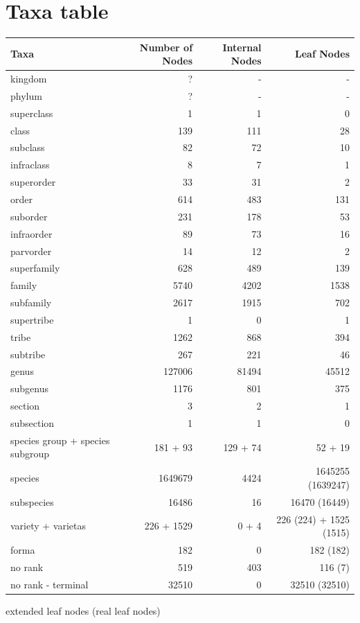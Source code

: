   \section{Taxa table}\label{sec:taxaTable2}
    \begin{center}
      \begin{tabular}{ |l|r||r|r| }
        \hline
        Taxa & Number of Nodes & Internal Nodes & Leaf Nodes \\
        \hline \hline
        \setrow{\bfseries}kingdom & ? & - & - \\ \hline
        \setrow{\bfseries}phylum & ? & - & - \\
        superclass & 1 & 1 & 0 \\ \hline
        \setrow{\bfseries}class & 139 & 111 & 28 \\
        subclass & 82 & 72 & 10 \\
        infraclass & 8 & 7 & 1 \\
        superorder & 33 & 31 & 2 \\ \hline
        \setrow{\bfseries}order & 614 & 483 & 131 \\
        suborder & 231 & 178 & 53 \\
        infraorder & 89 & 73 & 16 \\
        parvorder & 14 & 12 & 2 \\
        superfamily & 628 & 489 & 139 \\ \hline
        \setrow{\bfseries}family & 5740 & 4202 & 1538 \\
        subfamily & 2617 & 1915 & 702 \\
        supertribe & 1 & 0 & 1 \\
        tribe & 1262 & 868 & 394 \\
        subtribe & 267 & 221 & 46 \\ \hline
        \setrow{\bfseries}genus & 127006 & 81494 & 45512 \\
        subgenus & 1176 & 801 & 375 \\ \hline
        section & 3 & 2 & 1 \\
        subsection & 1 & 1 & 0 \\
        species group + species subgroup & 181 + 93 & 129 + 74 & 52 + 19 \\
        \setrow{\bfseries}species & 1649679 & 4424 & 1645255 (1639247) \\
        subspecies & 16486 & 16 & 16470 (16449) \\
        variety + varietas & 226 + 1529 & 0 + 4 & 226 (224) + 1525 (1515) \\
        forma & 182 & 0 & 182 (182) \\
        \hline \hline
        no rank & 519 & 403 & 116 (7) \\
        no rank - terminal & 32510 & 0 & 32510 (32510) \\
        \hline  
      \end{tabular}
    \end{center}
    extended leaf nodes (real leaf nodes)


